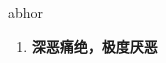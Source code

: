
\begin{frame}
{\huge abhor}
\begin{center}
\begin{enumerate}\Large
  \item \textbf{深恶痛绝，极度厌恶}
\end{enumerate}
\end{center}
\end{frame}
